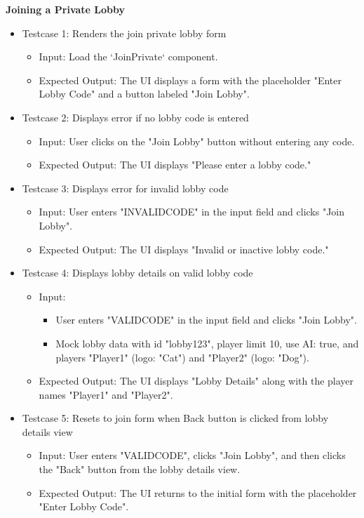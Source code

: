 \noindent
\textbf{Joining a Private Lobby}
\begin{itemize}
    \item Testcase 1: Renders the join private lobby form
    \begin{itemize}
        \item Input: Load the `JoinPrivate` component.
        \item Expected Output: The UI displays a form with the placeholder "Enter Lobby Code" and a button labeled "Join Lobby".
    \end{itemize}

    \item Testcase 2: Displays error if no lobby code is entered
    \begin{itemize}
        \item Input: User clicks on the "Join Lobby" button without entering any code.
        \item Expected Output: The UI displays "Please enter a lobby code."
    \end{itemize}

    \item Testcase 3: Displays error for invalid lobby code
    \begin{itemize}
        \item Input: User enters "INVALIDCODE" in the input field and clicks "Join Lobby".
        \item Expected Output: The UI displays "Invalid or inactive lobby code."
    \end{itemize}

    \item Testcase 4: Displays lobby details on valid lobby code
    \begin{itemize}
        \item Input:
            \begin{itemize}
                \item User enters "VALIDCODE" in the input field and clicks "Join Lobby".
                \item Mock lobby data with id "lobby123", player limit 10, use AI: true, and players "Player1" (logo: "Cat") and "Player2" (logo: "Dog").
            \end{itemize}
        \item Expected Output: The UI displays "Lobby Details" along with the player names "Player1" and "Player2".
    \end{itemize}

    \item Testcase 5: Resets to join form when Back button is clicked from lobby details view
    \begin{itemize}
        \item Input: User enters "VALIDCODE", clicks "Join Lobby", and then clicks the "Back" button from the lobby details view.
        \item Expected Output: The UI returns to the initial form with the placeholder "Enter Lobby Code".
    \end{itemize}


\end{itemize}
